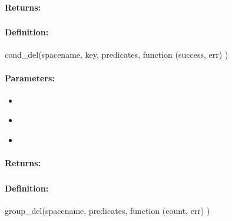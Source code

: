 \paragraph{Returns:}


\pagebreak
\subsubsection{}
\label{api:nodejs:cond_del}


\paragraph{Definition:}
\begin{javascriptcode}
cond_del(spacename, key, predicates, function (success, err) {})
\end{javascriptcode}
\paragraph{Parameters:}
\begin{itemize}[noitemsep]
\item {}\\

\item {}\\

\item {}\\

\end{itemize}

\paragraph{Returns:}


\pagebreak
\subsubsection{}
\label{api:nodejs:group_del}


\paragraph{Definition:}
\begin{javascriptcode}
group_del(spacename, predicates, function (count, err) {})
\end{javascriptcode}

